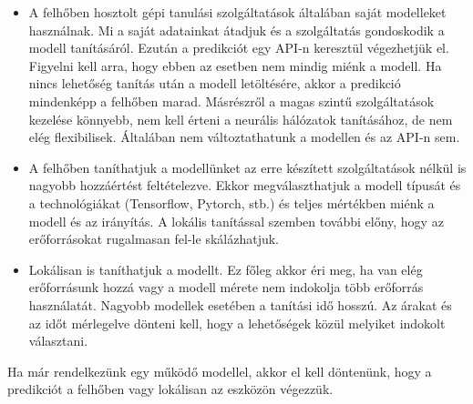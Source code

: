 \begin{itemize}
	\item A felhőben hosztolt gépi tanulási szolgáltatások általában saját modelleket használnak. Mi a saját adatainkat átadjuk és a szolgáltatás gondoskodik a modell tanításáról. Ezután a predikciót egy API-n keresztül végezhetjük el. Figyelni kell arra, hogy ebben az esetben nem mindig miénk a modell. Ha nincs lehetőség tanítás után a modell letöltésére, akkor a predikció mindenképp a felhőben marad. Másrészről a magas szintű szolgáltatások kezelése könnyebb, nem kell érteni a neurális hálózatok tanításához, de nem elég flexibilisek. Általában nem változtathatunk a modellen és az API-n sem.
	
	\item A felhőben taníthatjuk a modellünket az erre készített szolgáltatások nélkül is nagyobb hozzáértést feltételezve. Ekkor megválaszthatjuk a modell típusát és a technológiákat (Tensorflow, Pytorch, stb.) és teljes mértékben miénk a modell és az irányítás. A lokális tanítással szemben további előny, hogy az erőforrásokat rugalmasan fel-le skálázhatjuk.
	
	\item Lokálisan is taníthatjuk a modellt. Ez főleg akkor éri meg, ha van elég erőforrásunk hozzá vagy a modell mérete nem indokolja több erőforrás használatát. Nagyobb modellek esetében a tanítási idő hosszú. Az árakat és az időt mérlegelve dönteni kell, hogy a lehetőségek közül melyiket indokolt választani.
\end{itemize}

Ha már rendelkezünk egy működő modellel, akkor el kell döntenünk, hogy a predikciót a felhőben vagy lokálisan az eszközön végezzük.

